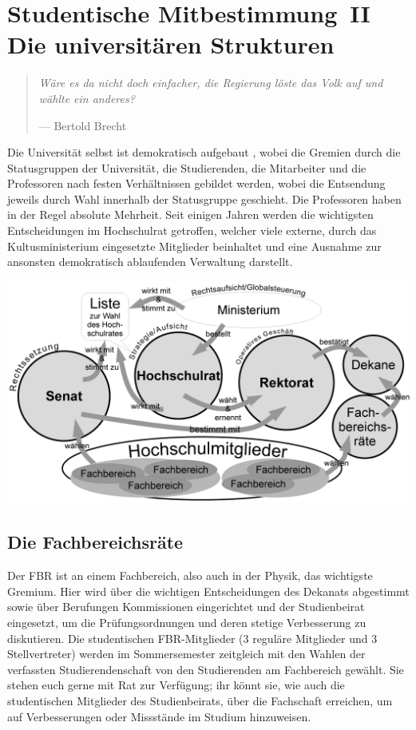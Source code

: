 \clearpage

\section*{Studentische Mitbestimmung~II\\Die universitären Strukturen}
\begin{multicols*}{2}
\begin{quote}
	\textit{Wäre es da nicht doch einfacher, die Regierung löste das Volk auf und wählte ein anderes?}
	
	\hfill--- Bertold Brecht
\end{quote}
Die Universität selbst ist demokratisch aufgebaut , wobei die Gremien durch die Statusgruppen der Universität, die Studierenden, die Mitarbeiter und die Professoren nach festen Verhältnissen gebildet werden, wobei die Entsendung jeweils durch Wahl innerhalb der Statusgruppe geschieht.
Die Professoren haben in der Regel absolute Mehrheit. Seit einigen Jahren werden die wichtigsten Entscheidungen im Hochschulrat getroffen, welcher viele externe, durch das Kultusministerium eingesetzte Mitglieder beinhaltet und eine Ausnahme zur ansonsten demokratisch ablaufenden Verwaltung darstellt.

\includegraphics[width=\columnwidth]{res/uni_strukturen.png}

\subsection{Die Fachbereichsräte}
Der FBR ist an einem Fachbereich, also auch in der Physik, das wichtigste Gremium.
Hier wird über die wichtigen Entscheidungen des Dekanats abgestimmt sowie über Berufungen Kommissionen eingerichtet und der Studienbeirat eingesetzt, um die Prüfungsordnungen und deren stetige Verbesserung zu diskutieren.
Die studentischen FBR-Mitglieder (3 reguläre Mitglieder und 3 Stellvertreter) werden im Sommersemester zeitgleich mit den Wahlen der verfassten Studierendenschaft von den Studierenden am Fachbereich gewählt.
Sie stehen euch gerne mit Rat zur Verfügung; ihr könnt sie, wie auch die studentischen Mitglieder des Studienbeirats, über die Fachschaft erreichen, um auf Verbesserungen oder Missstände im Studium hinzuweisen.


\end{multicols*}
